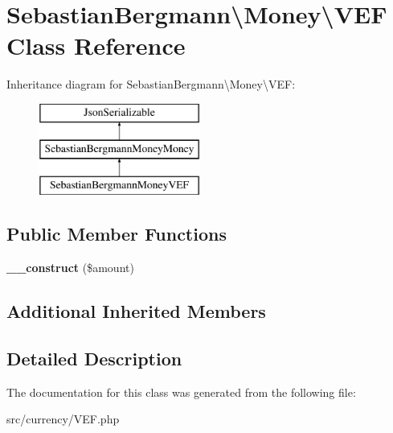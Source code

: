 \hypertarget{classSebastianBergmann_1_1Money_1_1VEF}{}\section{Sebastian\+Bergmann\textbackslash{}Money\textbackslash{}V\+E\+F Class Reference}
\label{classSebastianBergmann_1_1Money_1_1VEF}
Inheritance diagram for Sebastian\+Bergmann\textbackslash{}Money\textbackslash{}V\+E\+F\+:\begin{figure}[H]
\begin{center}
\leavevmode
\includegraphics[height=3.000000cm]{classSebastianBergmann_1_1Money_1_1VEF}
\end{center}
\end{figure}
\subsection*{Public Member Functions}
\begin{DoxyCompactItemize}
\item 
\hypertarget{classSebastianBergmann_1_1Money_1_1VEF_a0b4d28b0aaf38451de7c238a90b79391}{}{\bfseries \+\_\+\+\_\+construct} (\$amount)\label{classSebastianBergmann_1_1Money_1_1VEF_a0b4d28b0aaf38451de7c238a90b79391}

\end{DoxyCompactItemize}
\subsection*{Additional Inherited Members}


\subsection{Detailed Description}


The documentation for this class was generated from the following file\+:\begin{DoxyCompactItemize}
\item 
src/currency/V\+E\+F.\+php\end{DoxyCompactItemize}
